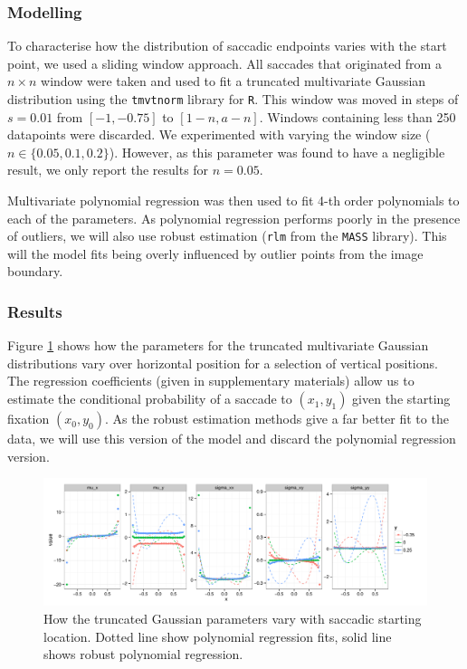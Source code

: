 \documentclass[a4paper, twocolumn, oneside, 10pt]{article}
\begin{document}
\subsubsection{Modelling}

To characterise how the distribution of saccadic endpoints varies with the start point, we used a sliding window approach. All saccades that originated from a $n\times n$ window were taken and used to fit a truncated multivariate Gaussian distribution using the \texttt{tmvtnorm} library for \texttt{R}. This window was moved in steps of $s=0.01$ from $[-1,-0.75]$ to $[1-n, a-n]$. Windows containing less than 250 datapoints were discarded. We experimented with varying the window size ($n\in\{0.05,0.1, 0.2\}$). However, as this parameter was found to have a negligible result, we only report the results for $n=0.05$.

Multivariate polynomial regression was then used to fit 4-th order polynomials to each of the parameters. As polynomial regression performs poorly in the presence of outliers, we will also use robust estimation (\texttt{rlm} from the \texttt{MASS} library). This will the model fits being overly influenced by outlier points from the image boundary. 

\subsubsection{Results}

Figure \ref{fig:nParamsOverSpace} shows how the parameters for the truncated multivariate Gaussian distributions vary over horizontal position for a selection of vertical positions. The regression coefficients (given in supplementary materials) allow us to estimate the conditional probability of a saccade to $(x_1, y_1)$ given the starting fixation $(x_0, y_0)$. As the robust estimation methods give a far better fit to the data, we will use this version of the model and discard the polynomial regression version.

\begin{figure}
\centering
\includegraphics[width=16cm]{../scripts/flow/figs/NparamsChagingOverSpace_ALL_tN}
\caption{How the truncated Gaussian parameters vary with saccadic starting location. Dotted line show polynomial regression fits, solid line shows robust polynomial regression.}
\label{fig:nParamsOverSpace}
\end{figure}
\end{document}
